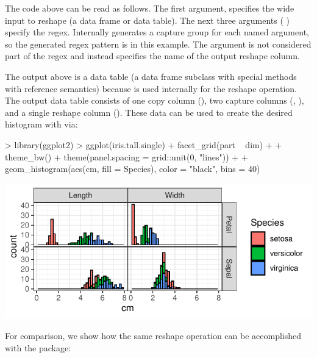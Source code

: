 The code above can be read as follows. The first argument, 
specifies the wide input to reshape (a data frame or data table). The next three
arguments (  )
specify the regex. Internally  generates a capture group for
each named argument, so the generated regex pattern is
 in this example. The  argument is
not considered part of the regex and instead specifies the name of
the output reshape column.

The output above is a data table (a data frame subclass with special
methods with reference semantics) because
 is used internally for the reshape
operation. The output data table consists of one copy column
(), two capture columns (, ), and a
single reshape column (). These data can be used to create
the desired histogram with  via:

\begin{Schunk}
\begin{Sinput}
> library(ggplot2)
> ggplot(iris.tall.single) + facet_grid(part ~ dim) +
+   theme_bw() + theme(panel.spacing = grid::unit(0, "lines")) +
+   geom_histogram(aes(cm, fill = Species), color = "black", bins = 40)
\end{Sinput}
\end{Schunk}
\includegraphics{hocking-hist}

For comparison, we show how the same reshape operation can be
accomplished with the  package:

